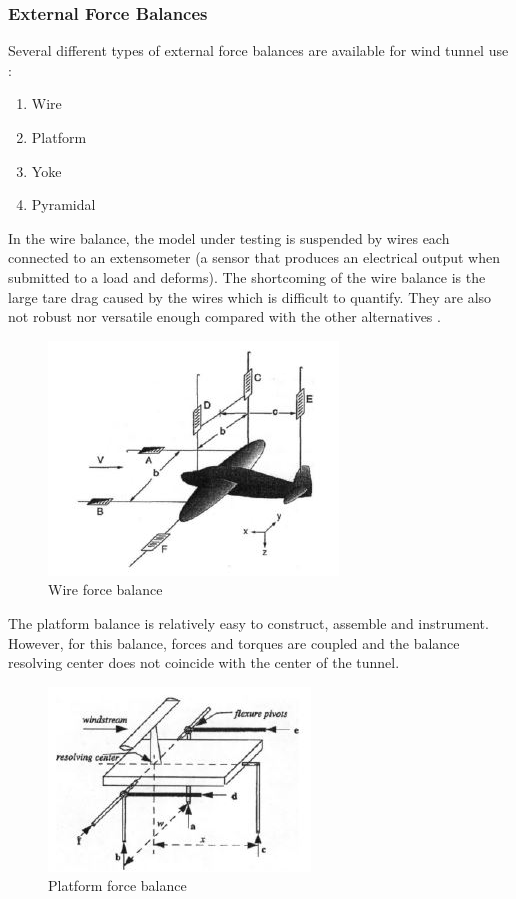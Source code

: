 \subsubsection{External Force Balances}
Several different types of external force balances are available for wind tunnel use
\cite{morris_force_2010}:
\begin{enumerate}
	\item Wire
	\item Platform
	\item Yoke
	\item Pyramidal
\end{enumerate}
In the wire balance, the model under testing is suspended by wires each connected to an extensometer (a sensor that produces an electrical output when submitted to a load and deforms). The shortcoming of the wire balance is the large tare drag caused by the wires which is difficult to quantify. They are also not robust nor versatile enough compared with the other alternatives \cite{ferreira2015design}.
\begin{center}
	\begin{figure}[H]
		\centering
		\includegraphics{Figures/Wire}
		\caption[Wire force balance]{Wire force balance \cite{ferreira2015design}}
	\end{figure}
\end{center}
The platform balance is relatively easy to construct, assemble and instrument. However, for this balance, forces and torques are coupled and the balance resolving center does not coincide with the center of the tunnel.
\begin{center}
	\begin{figure}[H]
		\centering
		\includegraphics{Figures/platform}
		\caption[Platform force balance]{Platform force balance \cite{ferreira2015design}}
	\end{figure}
\end{center}
